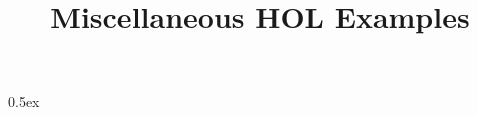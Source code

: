 \documentclass[11pt,a4paper]{article}
\begin{document}
\title{Miscellaneous HOL Examples}
\maketitle

\tableofcontents

\parindent 0pt\parskip 0.5ex




\end{document}
